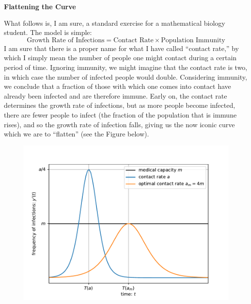 \documentclass[12pt]{article}
\begin{document}
\begin{center}
	\textbf{Flattening the Curve}
\end{center}
	What follows is, I am sure, a standard exercise for a mathematical biology student. The model is simple:
\begin{equation}
	\text{Growth Rate of Infections} = \text{Contact Rate}\times\text{Population Immunity}
\end{equation}
I am sure that there is a proper name for what I have called ``contact rate,'' by which I simply mean the number of people one might contact during a certain period of time. Ignoring immunity, we might imagine that the contact rate is two, in which case the number of infected people would double. Considering immunity, we conclude that a fraction of those with which one comes into contact have already been infected and are therefore immune. Early on, the contact rate determines the growth rate of infections, but as more people become infected, there are fewer people to infect (the fraction of the population that is immune rises), and so the growth rate of infection falls, giving us the now iconic curve which we are to ``flatten'' (see the Figure below). 

\begin{figure}[H]
	\begin{center}
		\includegraphics{curve}
	\end{center}
\end{figure}
\end{document}

